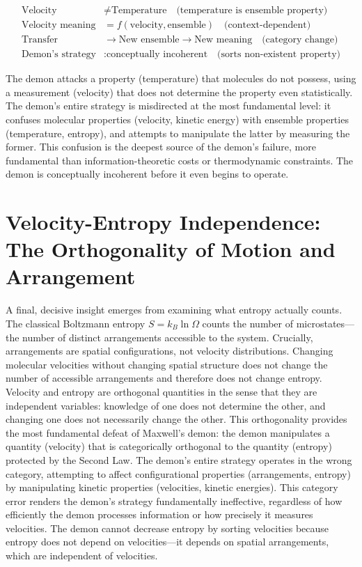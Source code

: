 \documentclass[12pt,a4paper]{article}
\theoremstyle{definition}
\theoremstyle{remark}
\begin{document}
\begin{equation}
\boxed{
\begin{aligned}
\text{Velocity} &\neq \text{Temperature} \quad \text{(temperature is ensemble property)} \\
\text{Velocity meaning} &= f(\text{velocity}, \text{ensemble}) \quad \text{(context-dependent)} \\
\text{Transfer} &\to \text{New ensemble} \to \text{New meaning} \quad \text{(category change)} \\
\text{Demon's strategy} &: \text{conceptually incoherent} \quad \text{(sorts non-existent property)}
\end{aligned}
}
\end{equation}

The demon attacks a property (temperature) that molecules do not possess, using a measurement (velocity) that does not determine the property even statistically. The demon's entire strategy is misdirected at the most fundamental level: it confuses molecular properties (velocity, kinetic energy) with ensemble properties (temperature, entropy), and attempts to manipulate the latter by measuring the former. This confusion is the deepest source of the demon's failure, more fundamental than information-theoretic costs or thermodynamic constraints. The demon is conceptually incoherent before it even begins to operate.

\section{Velocity-Entropy Independence: The Orthogonality of Motion and Arrangement}
\label{sec:velocity_entropy}

A final, decisive insight emerges from examining what entropy actually counts. The classical Boltzmann entropy $S = k_B \ln \Omega$ counts the number of microstates—the number of distinct arrangements accessible to the system. Crucially, arrangements are spatial configurations, not velocity distributions. Changing molecular velocities without changing spatial structure does not change the number of accessible arrangements and therefore does not change entropy. Velocity and entropy are orthogonal quantities in the sense that they are independent variables: knowledge of one does not determine the other, and changing one does not necessarily change the other. This orthogonality provides the most fundamental defeat of Maxwell's demon: the demon manipulates a quantity (velocity) that is categorically orthogonal to the quantity (entropy) protected by the Second Law. The demon's entire strategy operates in the wrong category, attempting to affect configurational properties (arrangements, entropy) by manipulating kinetic properties (velocities, kinetic energies). This category error renders the demon's strategy fundamentally ineffective, regardless of how efficiently the demon processes information or how precisely it measures velocities. The demon cannot decrease entropy by sorting velocities because entropy does not depend on velocities—it depends on spatial arrangements, which are independent of velocities.
\end{document}
